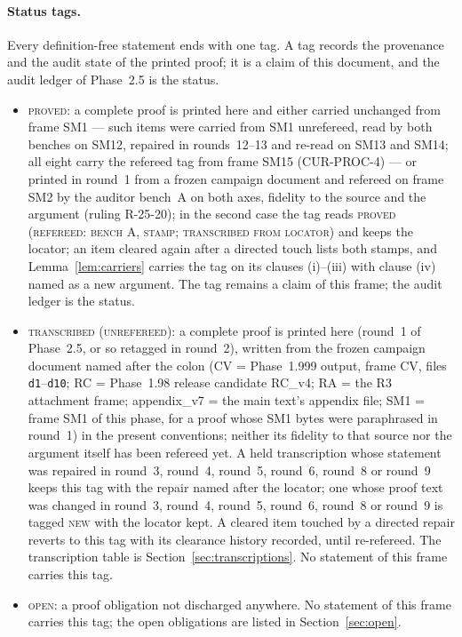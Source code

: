 \paragraph{Status tags.} Every definition-free statement ends with one tag.
A tag records the provenance and the audit state of the printed proof; it is
a claim of this document, and the audit ledger of Phase~2.5 is the status.
\begin{itemize}
\item \textsc{proved}: a complete proof is printed here and either carried
unchanged from frame SM1 --- such items were carried from SM1 unrefereed, read
by both benches on SM12, repaired in rounds~12--13 and re-read on SM13 and SM14;
all eight carry the refereed tag from frame SM15 (CUR-PROC-4) --- or printed in round~1 from a
frozen campaign document and refereed on frame SM2 by the auditor bench~A on
both axes, fidelity to the source and the argument (ruling R-25-20); in the
second case the tag reads \textsc{proved (refereed: bench A, stamp;
transcribed from locator)} and keeps the locator; an item cleared again
after a directed touch lists both stamps, and Lemma~\ref{lem:carriers}
carries the tag on its clauses (i)--(iii) with clause (iv) named as a new
argument. The tag remains a claim of
this frame; the audit ledger is the status.
\item \textsc{transcribed (unrefereed)}: a complete proof is printed here
(round~1 of Phase~2.5, or so retagged in round~2), written from the frozen
campaign document named after the colon (CV = Phase~1.999 output, frame CV,
files \texttt{d1}--\texttt{d10}; RC = Phase~1.98 release candidate RC\_v4; RA =
the R3 attachment frame; appendix\_v7 = the main text's appendix file; SM1 =
frame SM1 of this phase, for a proof whose SM1 bytes were paraphrased in
round~1) in the present conventions;
neither its fidelity to that source nor the argument itself has been refereed
yet. A held transcription whose statement was repaired in round~3, round~4,
round~5, round~6, round~8 or round~9 keeps this tag with the repair named after the locator; one whose proof
text was changed in round~3, round~4, round~5, round~6, round~8 or round~9 is tagged \textsc{new} with the locator
kept. A cleared item touched by a directed repair reverts to this tag with
its clearance history recorded, until re-refereed. The transcription table is Section~\ref{sec:transcriptions}. No statement of this frame carries this tag.
\item \textsc{open}: a proof obligation not discharged anywhere. No statement
of this frame carries this tag; the open obligations are listed in
Section~\ref{sec:open}.
\end{itemize}
\fi

